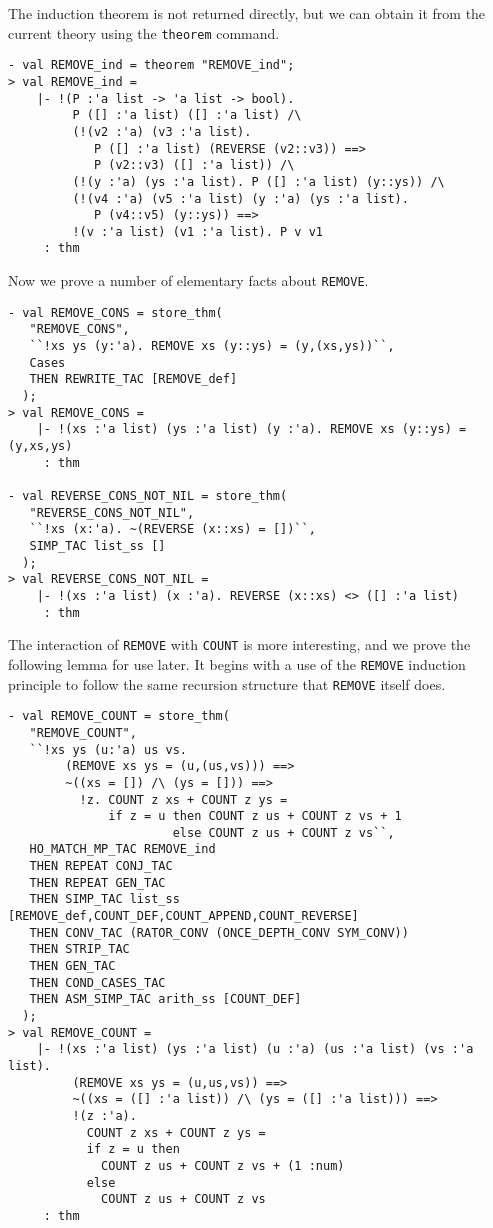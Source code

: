 The induction theorem is not returned directly, but we can obtain
it from the current theory using the \ML{} {\tt theorem} command.
\begin{session}
\begin{verbatim}
- val REMOVE_ind = theorem "REMOVE_ind";
> val REMOVE_ind =
    |- !(P :'a list -> 'a list -> bool).
         P ([] :'a list) ([] :'a list) /\
         (!(v2 :'a) (v3 :'a list).
            P ([] :'a list) (REVERSE (v2::v3)) ==>
            P (v2::v3) ([] :'a list)) /\
         (!(y :'a) (ys :'a list). P ([] :'a list) (y::ys)) /\
         (!(v4 :'a) (v5 :'a list) (y :'a) (ys :'a list).
            P (v4::v5) (y::ys)) ==>
         !(v :'a list) (v1 :'a list). P v v1
     : thm
\end{verbatim}
\end{session}

Now we prove a number of elementary facts about {\tt REMOVE}.
\begin{session}
\begin{verbatim}
- val REMOVE_CONS = store_thm(
   "REMOVE_CONS",
   ``!xs ys (y:'a). REMOVE xs (y::ys) = (y,(xs,ys))``,
   Cases
   THEN REWRITE_TAC [REMOVE_def]
  );
> val REMOVE_CONS =
    |- !(xs :'a list) (ys :'a list) (y :'a). REMOVE xs (y::ys) = (y,xs,ys)
     : thm

- val REVERSE_CONS_NOT_NIL = store_thm(
   "REVERSE_CONS_NOT_NIL",
   ``!xs (x:'a). ~(REVERSE (x::xs) = [])``,
   SIMP_TAC list_ss []
  );
> val REVERSE_CONS_NOT_NIL =
    |- !(xs :'a list) (x :'a). REVERSE (x::xs) <> ([] :'a list)
     : thm
\end{verbatim}
\end{session}

The interaction of {\tt REMOVE} with {\tt COUNT} is more
interesting, and we prove the following lemma for use later.
It begins with a use of the {\tt REMOVE} induction principle
to follow the same recursion structure that {\tt REMOVE} itself does.
\begin{session}
\begin{verbatim}
- val REMOVE_COUNT = store_thm(
   "REMOVE_COUNT",
   ``!xs ys (u:'a) us vs.
        (REMOVE xs ys = (u,(us,vs))) ==>
        ~((xs = []) /\ (ys = [])) ==>
          !z. COUNT z xs + COUNT z ys =
              if z = u then COUNT z us + COUNT z vs + 1
                       else COUNT z us + COUNT z vs``,
   HO_MATCH_MP_TAC REMOVE_ind
   THEN REPEAT CONJ_TAC
   THEN REPEAT GEN_TAC
   THEN SIMP_TAC list_ss [REMOVE_def,COUNT_DEF,COUNT_APPEND,COUNT_REVERSE]
   THEN CONV_TAC (RATOR_CONV (ONCE_DEPTH_CONV SYM_CONV))
   THEN STRIP_TAC
   THEN GEN_TAC
   THEN COND_CASES_TAC
   THEN ASM_SIMP_TAC arith_ss [COUNT_DEF]
  );
> val REMOVE_COUNT =
    |- !(xs :'a list) (ys :'a list) (u :'a) (us :'a list) (vs :'a list).
         (REMOVE xs ys = (u,us,vs)) ==>
         ~((xs = ([] :'a list)) /\ (ys = ([] :'a list))) ==>
         !(z :'a).
           COUNT z xs + COUNT z ys =
           if z = u then
             COUNT z us + COUNT z vs + (1 :num)
           else
             COUNT z us + COUNT z vs
     : thm
\end{verbatim}
\end{session}

